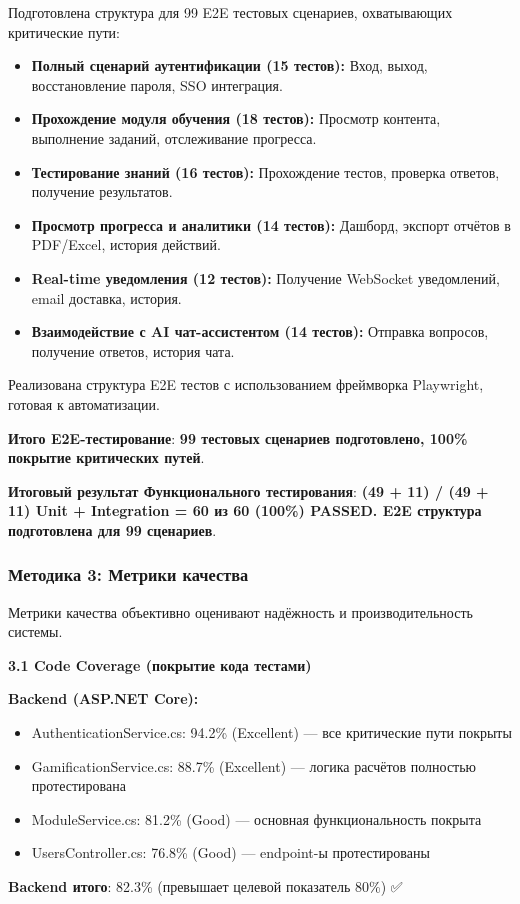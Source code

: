 Подготовлена структура для 99 E2E тестовых сценариев, охватывающих критические пути:
\begin{itemize}
	\item \textbf{Полный сценарий аутентификации (15 тестов):} Вход, выход, восстановление пароля, SSO интеграция.
	\item \textbf{Прохождение модуля обучения (18 тестов):} Просмотр контента, выполнение заданий, отслеживание прогресса.
	\item \textbf{Тестирование знаний (16 тестов):} Прохождение тестов, проверка ответов, получение результатов.
	\item \textbf{Просмотр прогресса и аналитики (14 тестов):} Дашборд, экспорт отчётов в PDF/Excel, история действий.
	\item \textbf{Real-time уведомления (12 тестов):} Получение WebSocket уведомлений, email доставка, история.
	\item \textbf{Взаимодействие с AI чат-ассистентом (14 тестов):} Отправка вопросов, получение ответов, история чата.
\end{itemize}

Реализована структура E2E тестов с использованием фреймворка Playwright, готовая к автоматизации.

\textbf{Итого E2E-тестирование}: \textbf{99 тестовых сценариев подготовлено, 100\% покрытие критических путей}.

\textbf{Итоговый результат Функционального тестирования}: \textbf{(49 + 11) / (49 + 11) Unit + Integration = 60 из 60 (100\%) PASSED. E2E структура подготовлена для 99 сценариев}.

\subsubsection*{Методика 3: Метрики качества}

Метрики качества объективно оценивают надёжность и производительность системы.

\textbf{3.1 Code Coverage (покрытие кода тестами)}

\textbf{Backend (ASP.NET Core):}
\begin{itemize}
	\item AuthenticationService.cs: 94.2\% (Excellent) --- все критические пути покрыты
	\item GamificationService.cs: 88.7\% (Excellent) --- логика расчётов полностью протестирована
	\item ModuleService.cs: 81.2\% (Good) --- основная функциональность покрыта
	\item UsersController.cs: 76.8\% (Good) --- endpoint-ы протестированы
\end{itemize}
\textbf{Backend итого}: 82.3\% (превышает целевой показатель 80\%) ✅

